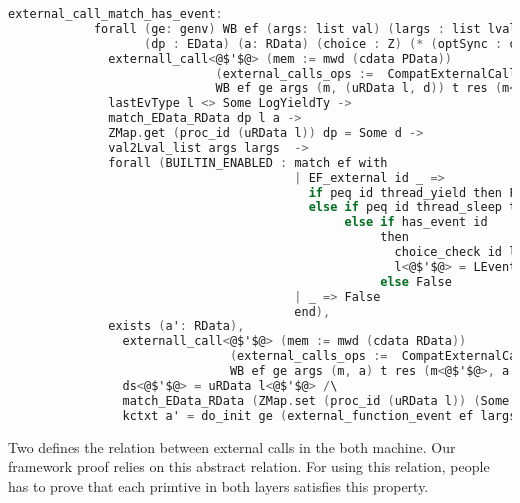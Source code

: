 \begin{lstlisting}[language=C]     
          external_call_match_has_event:
            forall (ge: genv) WB ef (args: list val) (largs : list lval) t res (m m<@$'$@> : mem) l l<@$'$@> d d<@$'$@> ds<@$'$@> 
                   (dp : EData) (a: RData) (choice : Z) (* (optSync : option SyncChanPool) *),
              externall_call<@$'$@> (mem := mwd (cdata PData)) 
                             (external_calls_ops :=  CompatExternalCalls.compatlayer_extcall_ops (LH  <@$\oplus$@>  L64))
                             WB ef ge args (m, (uRData l, d)) t res (m<@$'$@>, (ds<@$'$@>, d<@$'$@>)) ->
              lastEvType l <> Some LogYieldTy ->
              match_EData_RData dp l a ->
              ZMap.get (proc_id (uRData l)) dp = Some d ->
              val2Lval_list args largs  ->
              forall (BUILTIN_ENABLED : match ef with
                                        | EF_external id _ => 
                                          if peq id thread_yield then False
                                          else if peq id thread_sleep then False
                                               else if has_event id 
                                                    then
                                                      choice_check id largs (uRData l) d = choice /\
                                                      l<@$'$@> = LEvent (proc_id (uRData l)) (LogPrim id largs choice (snap_func d)) :: l 
                                                    else False 
                                        | _ => False
                                        end),
              exists (a': RData),
                externall_call<@$'$@> (mem := mwd (cdata RData)) 
                               (external_calls_ops :=  CompatExternalCalls.compatlayer_extcall_ops (pbthread  <@$\oplus$@>  L64))
                               WB ef ge args (m, a) t res (m<@$'$@>, a') /\
                ds<@$'$@> = uRData l<@$'$@> /\
                match_EData_RData (ZMap.set (proc_id (uRData l)) (Some d<@$'$@>) dp) l<@$'$@> a' /\
                kctxt a' = do_init ge (external_function_event ef largs l choice (snap_func d)) l (kctxt a);
\end{lstlisting}

Two defines the relation between external calls in the both machine. 
Our framework proof relies on this abstract relation.
For using this relation, 
people has to prove that each primtive in both layers 
satisfies this property. 


